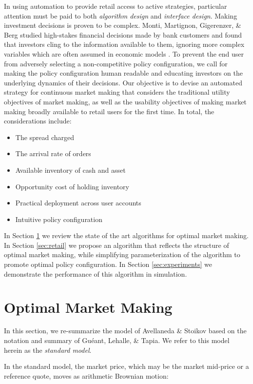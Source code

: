 \documentclass{article}
\begin{document}
In using automation to provide retail access to active strategies, particular attention must be paid to both \emph{algorithm design} and \emph{interface design}. Making investment decisions is proven to be complex. Monti, Martignon, Gigerenzer, \& Berg studied high-stakes financial decisions made by bank customers and found that investors cling to the information available to them, ignoring more complex variables which are often assumed in economic models \cite{monti2009impact}. To prevent the end user from adversely selecting a non-competitive policy configuration, we call for making the policy configuration human readable and educating investors on the underlying dynamics of their decisions. Our objective is to devise an automated strategy for continuous market making that considers the traditional utility objectives of market making, as well as the usability objectives of making market making broadly available to retail users for the first time. In total, the considerations include:

\begin{itemize}
  \item The spread charged
  \item The arrival rate of orders
  \item Available inventory of cash and asset
  \item Opportunity cost of holding inventory
  \item Practical deployment across user accounts
  \item Intuitive policy configuration
\end{itemize}

In Section \ref{sec:optimal} we review the state of the art algorithms for optimal market making. In Section \ref{sec:retail} we propose an algorithm that reflects the structure of optimal market making, while simplifying parameterization of the algorithm to promote optimal policy configuration. In Section \ref{sec:experiments} we demonstrate the performance of this algorithm in simulation.

\section{Optimal Market Making}
\label{sec:optimal}

In this section, we re-summarize the model of Avellaneda \& Stoikov based on the notation and summary of Guéant, Lehalle, \& Tapia. We refer to this model herein as the \emph{standard model}.

In the standard model, the market price, which may be the market mid-price or a reference quote, moves as arithmetic Brownian motion:
\end{document}
